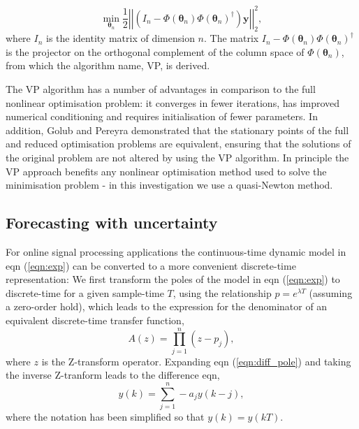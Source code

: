 \documentclass{article}
\newcommand{\vnorm}[1]{\left|\left|#1\right|\right|}
\begin{document}
\begin{equation} \label{eqn:cost2}
\min_{\boldsymbol{\theta}_n} \frac{1}{2} \vnorm { \left( I_n - \Phi \left( \boldsymbol{\theta}_n \right) \Phi \left( \boldsymbol{\theta}_n \right) ^{\dagger} \right)  \mathbf{y}  } _{2}^{2} ,
\end{equation}
where $I_n$ is the identity matrix of dimension $n$.  The matrix $I_n - \Phi \left( \boldsymbol{\theta}_n \right) \Phi \left( \boldsymbol{\theta}_n \right) ^{\dagger} $ is the projector on the orthogonal complement of the column space of $\Phi \left( \boldsymbol{\theta}_n \right)$, from which the algorithm name, VP, is derived.  

The VP algorithm has a number of advantages in comparison to the full nonlinear optimisation problem:  it converges in fewer iterations, has improved numerical conditioning and requires initialisation of fewer parameters.  In addition, Golub and Pereyra demonstrated that the stationary points of the full and reduced optimisation problems are equivalent, ensuring that the solutions of the original problem are not altered by using the VP algorithm.  In principle the VP approach benefits any nonlinear optimisation method used to solve the minimisation problem -  in this investigation we use a quasi-Newton method.

\subsection{Forecasting with uncertainty}
    
For online signal processing applications the continuous-time dynamic model in eqn (\ref{eqn:exp}) can be converted to a more convenient discrete-time representation: We first transform the poles of the model in eqn (\ref{eqn:exp}) to discrete-time for a given sample-time $T$, using the relationship $p=e^{\lambda T}$ (assuming a zero-order hold), which leads to the expression for the denominator of an equivalent discrete-time transfer function,
\begin{equation} \label{eqn:diff_pole}
A(z) = \prod_{j=1}^{n} \left(z - p_{j} \right) ,
\end{equation}  
where $z$ is the Z-transform operator.  Expanding eqn (\ref{eqn:diff_pole}) and taking the inverse Z-tranform leads to the difference eqn,
\begin{equation} \label{eqn:diff}
y(k) = \sum_{j=1}^{n} -a_j y(k-j) ,
\end{equation}  
where the notation has been simplified so that $y(k)=y(kT)$.
    
\end{document}
